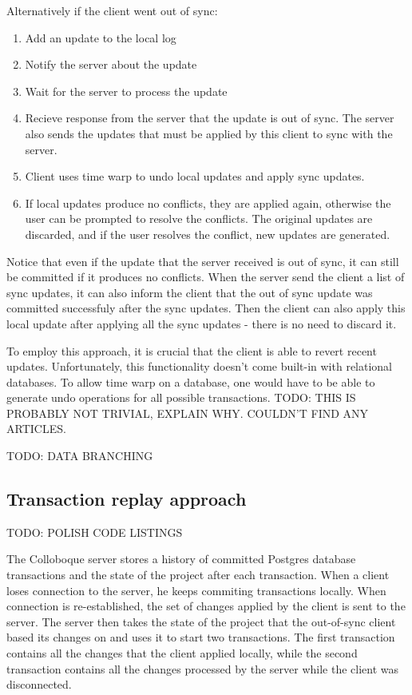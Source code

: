 \documentclass[a4paper, 11pt, oneside]{article}
\theoremstyle{definition}
\begin{document}
Alternatively if the client went out of sync:

\begin{enumerate}
    \item Add an update to the local log
    \item Notify the server about the update
    \item Wait for the server to process the update
    \item Recieve response from the server that the update is out of sync. The server also sends the updates that must be applied by this client to sync with the server.
    \item Client uses time warp to undo local updates and apply sync updates.
    \item If local updates produce no conflicts, they are applied again, otherwise the user can be prompted to resolve the conflicts. The original updates are discarded, and if the user resolves the conflict, new updates are generated.
\end{enumerate}

Notice that even if the update that the server received is out of sync, it can still be committed if it produces no conflicts. When the server send the client a list of sync updates, it can also inform the client that the out of sync update was committed successfuly after the sync updates. Then the client can also apply this local update after applying all the sync updates - there is no need to discard it.

To employ this approach, it is crucial that the client is able to revert recent updates. Unfortunately, this functionality doesn't come built-in with relational databases. To allow time warp on a database, one would have to be able to generate undo operations for all possible transactions. TODO: THIS IS PROBABLY NOT TRIVIAL, EXPLAIN WHY. COULDN'T FIND ANY ARTICLES.

TODO: DATA BRANCHING

\subsection{Transaction replay approach}
TODO: POLISH CODE LISTINGS

The Colloboque server stores a history of committed Postgres database transactions and the state of the project after each transaction. When a client loses connection to the server, he keeps commiting transactions locally. When connection is re-established, the set of changes applied by the client is sent to the server. The server then takes the state of the project that the out-of-sync client based its changes on and uses it to start two transactions. The first transaction contains all the changes that the client applied locally, while the second transaction contains all the changes processed by the server while the client was disconnected. 
\end{document}
